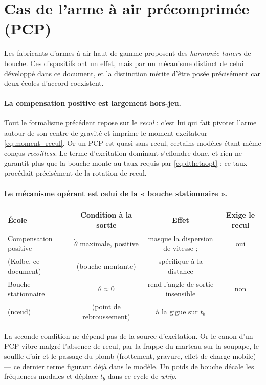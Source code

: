 \documentclass[12pt,a4paper]{article}
\begin{document}
	\section{Cas de l'arme à air précomprimée (PCP)}
	\label{sec:pcp}

	Les fabricants d'armes à air haut de gamme proposent des \emph{harmonic tuners} de bouche. Ces dispositifs ont un effet, mais par un mécanisme distinct de celui développé dans ce document, et la distinction mérite d'être posée précisément car deux écoles d'accord coexistent.

	\paragraph{La compensation positive est largement hors-jeu.} Tout le formalisme précédent repose sur le \emph{recul} : c'est lui qui fait pivoter l'arme autour de son centre de gravité et imprime le moment excitateur \eqref{eq:moment_recul}. Or un PCP est quasi sans recul, certains modèles étant même conçus \emph{recoilless}. Le terme d'excitation dominant s'effondre donc, et rien ne garantit plus que la bouche monte au taux requis par \eqref{eq:dthetaopt} : ce taux procédait précisément de la rotation de recul.

	\paragraph{Le mécanisme opérant est celui de la « bouche stationnaire ».}
	\begin{center}
	\begin{tabular}{lccc}
		\toprule
		École & Condition à la sortie & Effet & Exige le recul \\
		\midrule
		Compensation positive & $\dot\theta$ maximale, positive & masque la dispersion de vitesse ; & oui \\
		(Kolbe, ce document) & (bouche montante) & spécifique à la distance & \\
		Bouche stationnaire & $\dot\theta \approx 0$ & rend l'angle de sortie insensible & non \\
		(n\oe ud) & (point de rebroussement) & à la gigue sur $t_b$ & \\
		\bottomrule
	\end{tabular}
	\end{center}

	La seconde condition ne dépend pas de la source d'excitation. Or le canon d'un PCP vibre malgré l'absence de recul, par la frappe du marteau sur la soupape, le souffle d'air et le passage du plomb (frottement, gravure, effet de charge mobile) --- ce dernier terme figurant déjà dans le modèle. Un poids de bouche décale les fréquences modales et déplace $t_b$ dans ce cycle de \emph{whip}.
\end{document}

